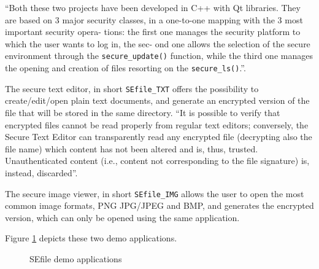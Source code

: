 ``Both these two projects have been developed in C++ with Qt libraries. They are based on 3
major security classes, in a one-to-one mapping with the 3 most important security opera-
tions: the first one manages the security platform to which the user wants to log in, the sec-
ond one allows the selection of the secure environment through the \texttt{secure\_update()} function, while the third one manages the opening and creation of files resorting on the \texttt{secure\_ls()}.''\citep{L2UserMan}.

The secure text editor, in short \texttt{SEfile\_TXT} offers the possibility to create/edit/open plain text documents, and generate an encrypted version of the file that will be stored in the same directory. ``It is possible to verify that encrypted files cannot be read properly from regular text editors; conversely, the Secure Text Editor can transparently read any encrypted file (decrypting also the file name) which content has not been altered and is, thus, trusted. Unauthenticated content (i.e., content not corresponding to the file signature) is, instead, discarded''.

The secure image viewer, in short \texttt{SEfile\_IMG} allows the user to open the most common image formats, PNG JPG/JPEG and BMP, and generates the encrypted version, which can only be opened using the same application.

Figure \ref{fig:sefiledem} depicts these two demo applications.

\begin{figure}[ht]
  \centering
  {}
  \caption{SEfile demo applications}
 \label{fig:sefiledem}
\end{figure}

